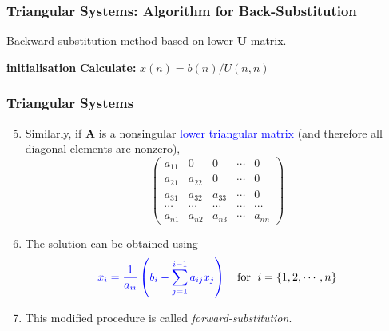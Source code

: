 \documentclass[10pt,compress]{beamer}
\begin{document}
\begin{frame}[fragile]
  \frametitle{Triangular Systems: Algorithm for Back-Substitution} 
    \begin{algorithm}[H]\caption{Backward-substitution method based on lower $\bm{U}$ matrix.}
      {\bf initialisation}\;
      {\bf Calculate:} $x(n) = b(n) / U(n,n)$\;
       \label{linalg:algbacksubst}
    \end{algorithm}
\end{frame}


\begin{frame}
  \frametitle{Triangular Systems} 
  \begin{enumerate}
  \setcounter{enumi}{4}
    \item <1-> Similarly, if $\bm{A}$ is a nonsingular \textcolor{blue}{lower triangular matrix}  (and therefore all diagonal elements are nonzero),  
      \begin{displaymath}
         \begin{pmatrix}
           a_{11} & 0     & 0     & \cdots & 0 \\
           a_{21} & a_{22} & 0     & \cdots & 0 \\
           a_{31} & a_{32} & a_{33} & \cdots & 0 \\
           \cdots & \cdots & \cdots & \cdots & \cdots \\
           a_{n1} & a_{n2} & a_{n3} & \cdots & a_{nn}       
         \end{pmatrix}
      \end{displaymath}
    \item <2-> The solution can be obtained using
       \begin{equation}
          \textcolor{blue}{x_{i} = \frac{1}{a_{ii}}\left(b_{i} - \sum\limits_{j=1}^{i-1}a_{ij} x_{j}\right)}\;\;\;\text{ for } \; i=\left\{1, 2, \cdots, n\right\}\label{linalg:lowermatrix}
       \end{equation}
    \item <3-> This modified procedure is called {\it forward-substitution}.
  \end{enumerate}
\end{frame}
\end{document}
